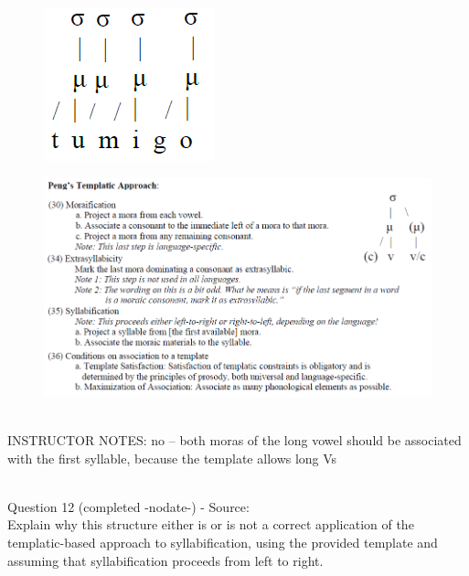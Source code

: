 \documentclass[12pt]{article}
\begin{document}
\begin{figure}[H]
\includegraphics{../images/pengtemplate_tuumigo_no.png}
\end{figure}
\begin{figure}[H]
\includegraphics{../images/peng_template_withdiagram.png}
\end{figure}

~\\
INSTRUCTOR NOTES: no -- both moras of the long vowel should be associated with the first syllable, because the template allows long Vs


~\\

{\large Question 12} (completed -nodate-) - Source: \\

Explain why this structure either is or is not a correct application of the templatic-based approach to syllabification, using the provided template and assuming that syllabification proceeds from left to right.\\
\end{document}
